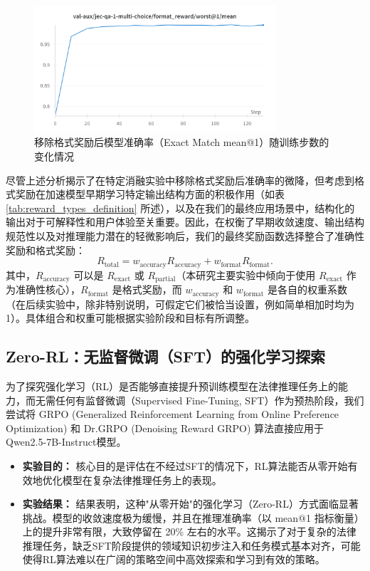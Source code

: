 \documentclass{article}
\newcommand{\qwen}{Qwen2.5-7B-Instruct}
\newcommand{\qwen}{Qwen2.5-7B-Instruct}
\begin{document}
\begin{figure}[h]
\centering
\includegraphics[width=0.8\textwidth]{figures/format.png} %
\caption{移除格式奖励后模型准确率（Exact Match mean@1）随训练步数的变化情况}
\label{fig:format_reward_ablation}
\end{figure}

尽管上述分析揭示了在特定消融实验中移除格式奖励后准确率的微降，但考虑到格式奖励在加速模型早期学习特定输出结构方面的积极作用（如表 \ref{tab:reward_types_definition} 所述），以及在我们的最终应用场景中，结构化的输出对于可解释性和用户体验至关重要。因此，在权衡了早期收敛速度、输出结构规范性以及对推理能力潜在的轻微影响后，我们的最终奖励函数选择整合了准确性奖励和格式奖励：
\begin{equation}
R_{\text{total}} = w_{\text{accuracy}} R_{\mathrm{accuracy}} + w_{\mathrm{format}} R_{\mathrm{format}}.
\end{equation}
其中，$R_{\mathrm{accuracy}}$ 可以是 $R_{\mathrm{exact}}$ 或 $R_{\mathrm{partial}}$（本研究主要实验中倾向于使用 $R_{\mathrm{exact}}$ 作为准确性核心），$R_{\mathrm{format}}$ 是格式奖励，而 $w_{\text{accuracy}}$ 和 $w_{\mathrm{format}}$ 是各自的权重系数（在后续实验中，除非特别说明，可假定它们被恰当设置，例如简单相加时均为1）。具体组合和权重可能根据实验阶段和目标有所调整。

\subsection{Zero-RL：无监督微调（SFT）的强化学习探索}
为了探究强化学习（RL）是否能够直接提升预训练模型在法律推理任务上的能力，而无需任何有监督微调（Supervised Fine-Tuning, SFT）作为预热阶段，我们尝试将 GRPO (Generalized Reinforcement Learning from Online Preference Optimization) 和 Dr.GRPO (Denoising Reward GRPO) 算法直接应用于 \qwen 模型。
\begin{itemize}
    \item \textbf{实验目的：} 核心目的是评估在不经过SFT的情况下，RL算法能否从零开始有效地优化模型在复杂法律推理任务上的表现。
    \item \textbf{实验结果：} 结果表明，这种"从零开始"的强化学习（Zero-RL）方式面临显著挑战。模型的收敛速度极为缓慢，并且在推理准确率（以 mean@1 指标衡量）上的提升非常有限，大致停留在 20\% 左右的水平。这揭示了对于复杂的法律推理任务，缺乏SFT阶段提供的领域知识初步注入和任务模式基本对齐，可能使得RL算法难以在广阔的策略空间中高效探索和学习到有效的策略。
\end{itemize}
\end{document}
